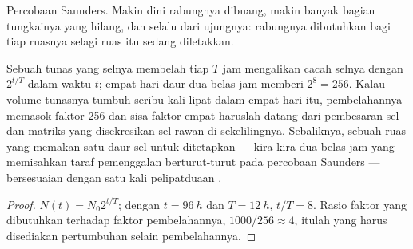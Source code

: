 \begin{omfigure}

{\small Percobaan Saunders. Makin dini rabungnya dibuang, makin banyak
bagian tungkainya yang hilang, dan selalu dari ujungnya: rabungnya
dibutuhkan bagi tiap ruasnya selagi ruas itu sedang diletakkan.}
\end{omfigure}

\begin{theorem}\label{thm:b2:limb-organogenesis:growth}
Sebuah tunas yang selnya membelah tiap $T$ jam mengalikan cacah selnya
dengan $2^{t/T}$ dalam waktu $t$; empat hari daur dua belas jam memberi
$2^{8} = 256$. Kalau volume tunasnya tumbuh seribu kali lipat dalam
empat hari itu, pembelahannya memasok faktor 256 dan sisa faktor empat
haruslah datang dari pembesaran sel dan matriks yang disekresikan sel
rawan di sekelilingnya. Sebaliknya, sebuah ruas yang memakan satu daur
sel untuk ditetapkan --- kira-kira dua belas jam yang memisahkan taraf
pemenggalan berturut-turut pada percobaan Saunders --- bersesuaian
dengan satu kali pelipatduaan .
\end{theorem}
\begin{proof}
$N(t) = N_0 2^{t/T}$; dengan $t = \qty{96}{h}$ dan $T = \qty{12}{h}$,
$t/T = 8$. Rasio faktor yang dibutuhkan terhadap faktor pembelahannya,
$1000/256 \approx 4$, itulah yang harus disediakan pertumbuhan selain
pembelahannya.
\end{proof}


